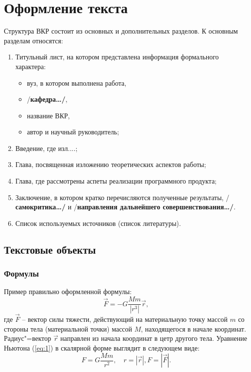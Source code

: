 \documentclass[a4paper,14pt,final]{extreport}
\newcommand{\aaa}[1]{{/\bfseries #1\ldots/}}
\begin{document}
\chapter{Оформление текста}
\label{cha:layout}

Структура ВКР состоит из основных и дополнительных разделов.  К основным разделам относятся:
\begin{enumerate}
\item Титульный лист, на котором представлена информация формального характера:
  \begin{itemize}
  \item вуз, в котором выполнена работа,
  \item \aaa{кафедра},
  \item название ВКР,
  \item автор и научный руководитель;
  \end{itemize}
\item Введение, где изл....;
\item Глава, посвященная изложению теоретических аспектов работы;
\item Глава, где рассмотрены аспеты реализации программного продукта;
\item Заключение, в котором кратко перечисляются полученные результаты, \aaa{самокритика} и \aaa{направления дальнейшего совершенствования}.
\item Список используемых источников (список литературы).
\end{enumerate}

\section{Текстовые объекты}
\label{sec:objs}

\subsection{Формулы}
\label{sec:formulae}

Пример правильно оформленной формулы:
\begin{equation}
  \label{eq:1}
  \vec{F} = -G\frac{Mm}{|r^3|}\vec{r},
\end{equation}
где $\vec{F}$ -- вектор силы тяжести, действующий на материальную точку массой $m$ со стороны тела (материальной точки) массой $M$, находящегося в начале координат.  Радиус"=вектор $\vec{r}$ направлен из начала координат в цетр другого тела.  Уравнение Ньютона (\ref{eq:1}) в скалярной форме выглядит в следующем виде:
\begin{equation*}
  F=G\frac{Mm}{r^2},\quad r=|\vec{r}|, F=|\vec{F}|.
\end{equation*}
\end{document}
